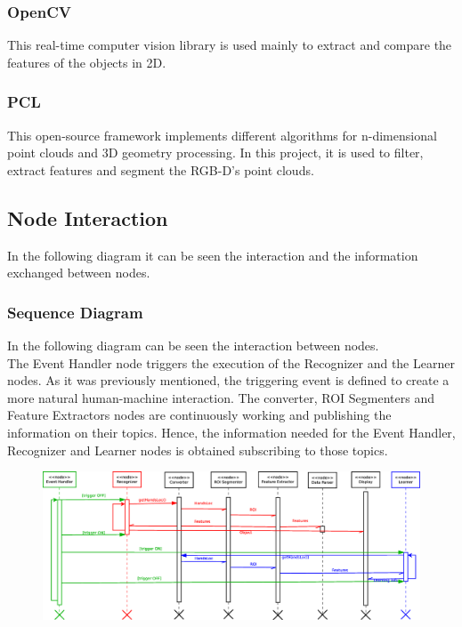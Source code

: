 \subsubsection{ OpenCV}
This real-time computer vision library is used mainly to extract and compare the features of the objects in 2D. 
\subsubsection{PCL}
This open-source framework implements different algorithms for n-dimensional point clouds and 3D geometry processing.
In this project, it is used to filter, extract features and segment the RGB-D's point clouds.

\subsection{Node Interaction}
In the following diagram it can be seen the interaction and the information exchanged between nodes.

\subsubsection{Sequence Diagram}
In the following diagram can be seen the interaction between nodes. \\
The Event Handler node triggers the execution of the Recognizer and the Learner nodes. As it was previously mentioned, the triggering event is defined to create a more natural human-machine interaction.
The converter, ROI Segmenters and Feature Extractors nodes are continuously working and publishing the information on their topics. 
Hence, the information needed for the Event Handler, Recognizer and Learner nodes is obtained subscribing to those topics. 
\begin{figure}[H]
\begin{center}
\includegraphics[width=\textwidth]{img/diagrams/sequence.eps}
\end{center}
\end{figure}

